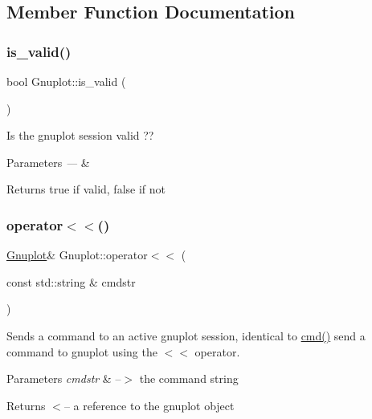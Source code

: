 \subsection{Member Function Documentation}
\mbox{\label{classGnuplot_a3135ffebb308b50c4f3178a62b23ab03}} 
\subsubsection{\texorpdfstring{is\+\_\+valid()}{is\_valid()}}
{\footnotesize\ttfamily bool Gnuplot\+::is\+\_\+valid (\begin{DoxyParamCaption}{ }\end{DoxyParamCaption})\hspace{0.3cm}{\ttfamily [inline]}}



Is the gnuplot session valid ?? 


\begin{DoxyParams}{Parameters}
{\em ---} & \\
\hline
\end{DoxyParams}
\begin{DoxyReturn}{Returns}
true if valid, false if not 
\end{DoxyReturn}
\mbox{\label{classGnuplot_afb69631c7a498077e378a3cbb56f38c8}} 
\subsubsection{\texorpdfstring{operator$<$$<$()}{operator<<()}}
{\footnotesize\ttfamily \hyperlink{classGnuplot}{Gnuplot}\& Gnuplot\+::operator$<$$<$ (\begin{DoxyParamCaption}\item[{const std\+::string \&}]{cmdstr }\end{DoxyParamCaption})\hspace{0.3cm}{\ttfamily [inline]}}



Sends a command to an active gnuplot session, identical to \hyperlink{classGnuplot_a07607803ede8dd5416906df0a1924fc5}{cmd()} send a command to gnuplot using the $<$$<$ operator. 


\begin{DoxyParams}{Parameters}
{\em cmdstr} & --$>$ the command string\\
\hline
\end{DoxyParams}
\begin{DoxyReturn}{Returns}
$<$-- a reference to the gnuplot object 
\end{DoxyReturn}
\mbox{\label{classGnuplot_a42dfb8c9d4636745c7be277ed818e849}} 
